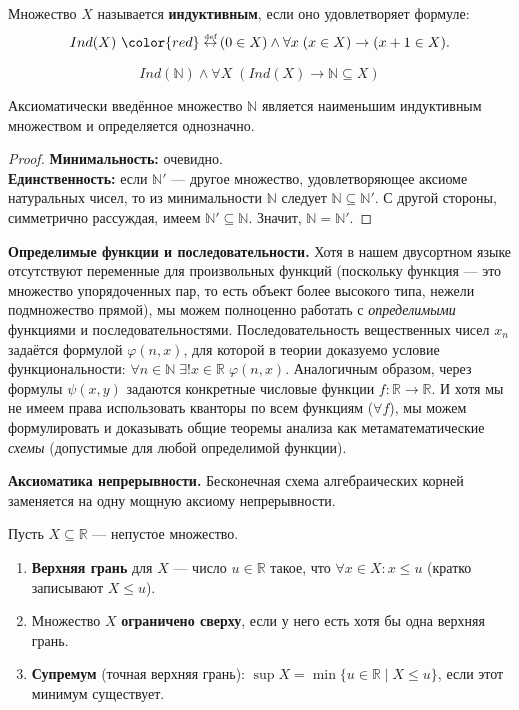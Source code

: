 \documentclass[11pt, a4paper]{extarticle}
\newcommand{\ph}{\varphi}
\newcommand{\R}{{\mathbb R}}
\newcommand{\N}{{\mathbb N}}
\renewcommand{\le}{\leqslant}
\newcommand{\lradef}{\,\mathop{\color{red}\overset{\mbox{\tiny def}}{\leftrightarrow}}\,}
\newcommand{\pf}{\begin{proof}}
\newcommand{\epf}{\end{proof}}
\begin{document}
\begin{definition}
Множество $X$ называется \textbf{индуктивным}, если оно удовлетворяет формуле:
\[
  Ind(X)\lradef (0 \in X) \land \forall x\; (x \in X) \to (x + 1 \in X).
\]
\end{definition}

\begin{axiom}
\[Ind(\N)\land\forall X\; (Ind(X) \to \N \subseteq X)\]
\end{axiom}

\begin{theorem}[Минимальность и единственность $\N$]
Аксиоматически введённое множество $\N$ является наименьшим индуктивным множеством и определяется однозначно.
\end{theorem}
\pf
\textbf{Минимальность:} очевидно.\\
\textbf{Единственность:} если $\N'$ --- другое множество, удовлетворяющее аксиоме натуральных чисел, то из минимальности $\N$ следует $\N \subseteq \N'$. С другой стороны, симметрично рассуждая, имеем $\N' \subseteq \N$. Значит, $\N = \N'$.
\epf

\smallskip\noindent\textbf{Определимые функции и последовательности.}
Хотя в нашем двусортном языке отсутствуют переменные для произвольных функций (поскольку функция --- это множество упорядоченных пар, то есть объект более высокого типа, нежели подмножество прямой), мы можем полноценно работать с \emph{определимыми} функциями и последовательностями. Последовательность вещественных чисел $x_n$ задаётся формулой $\ph(n, x)$, для которой в теории доказуемо условие функциональности: $\forall n \in \N\; \exists! x \in \R\; \ph(n, x)$. Аналогичным образом, через формулы $\psi(x, y)$ задаются конкретные числовые функции $f: \R \to \R$. И хотя мы не имеем права использовать кванторы по всем функциям ($\forall f$), мы можем формулировать и доказывать общие теоремы анализа как метаматематические \emph{схемы} (допустимые для любой определимой функции).


\smallskip\noindent\textbf{Аксиоматика непрерывности.} 
Бесконечная схема алгебраических корней заменяется на одну мощную аксиому непрерывности.

\begin{definition}
Пусть $X \subseteq \R$ --- непустое множество.
\begin{enumerate}
    \item \textbf{Верхняя грань} для $X$ --- число $u \in \R$ такое, что $\forall x \in X: x \le u$ (кратко записывают $X \le u$).
    \item Множество $X$ \textbf{ограничено сверху}, если у него есть хотя бы одна верхняя грань.
    \item \textbf{Супремум} (точная верхняя грань): $\sup X = \min\{u \in \R \mid X \le u\}$, если этот минимум существует.
\end{enumerate}
\end{definition}
\end{document}
